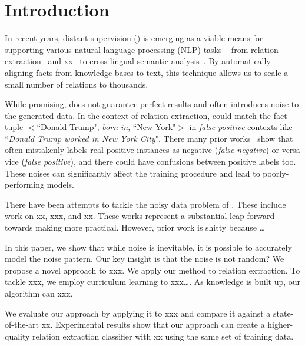 \section{Introduction}

In recent years, distant supervision (\DS) is emerging as a viable means for supporting various natural language
processing (NLP) tasks -- from relation extraction~\cite{mintz2009distant} and xx~\cite{} to cross-lingual semantic
analysis~\cite{fang2016learning}. By automatically aligning
facts from knowledge bases to text, this technique allows us to scale a small number of relations to thousands.



While promising, \DS does not guarantee perfect results and often introduces noise to the
generated data. In the context of relation extraction, \DS could match the fact tuple $<$``Donald Trump",
\emph{born-in}, ``New York"$>$  in \emph{false positive} contexts like ``\emph{Donald Trump worked in New York City}".
There many prior works~\cite{} show that \DS often mistakenly labels real positive instances as negative (\emph{false negative}) or
versa vice (\emph{false positive}), and there could have confusions between positive labels too. These noises can
significantly affect the training
procedure and lead to poorly-performing models. 

There have been attempts to tackle the noisy data problem of \DS. These
include work on xx, xxx, and xx. These works represent a substantial leap
forward towards making \DS more practical. However, prior work is shitty
because …

In this paper, we show that while noise is inevitable, it is possible to
accurately model the noise pattern. Our key insight is that the noise is not
random? We propose a novel approach to xxx. We apply our method to relation
extraction. To tackle xxx, we employ curriculum learning to xxx…. As
knowledge is built up, our algorithm can xxx.

We evaluate our approach by applying it to xxx and compare it against a
state-of-the-art xx. Experimental results show that our approach can create a
higher-quality relation extraction classifier with xx%
using the same set of training data.
